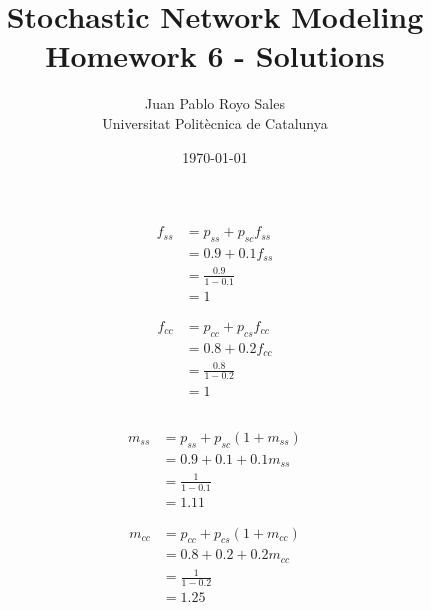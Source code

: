 \documentclass[12pt, a4paper]{article}
\title{%
  Stochastic Network Modeling \\
  Homework 6 - Solutions
}
\author{%
  Juan Pablo Royo Sales\\
  \small{Universitat Politècnica de Catalunya}
}
\date\today
\begin{document}
\maketitle

\section{}
\subsection{}
\begin{subequations}
  \begin{align}
    f_{ss} &= p_{ss} + p_{sc}f_{ss}\\
           &= 0.9 + 0.1 f_{ss}\\
           &= \frac{0.9}{1-0.1}\\
           &= 1
  \end{align}
\end{subequations}


\begin{subequations}
  \begin{align}
    f_{cc} &= p_{cc} + p_{cs}f_{cc}\\
           &= 0.8 + 0.2 f_{cc}\\
           &= \frac{0.8}{1-0.2}\\
           &= 1
  \end{align}
\end{subequations}


\subsection{}

\begin{subequations}
  \begin{align}
    m_{ss} &= p_{ss} + p_{sc}(1 + m_{ss})\\
           &= 0.9 + 0.1  + 0.1 m_{ss}\\
           &= \frac{1}{1-0.1}\\
           &= 1.11
  \end{align}
\end{subequations}


\begin{subequations}
  \begin{align}
    m_{cc} &= p_{cc} + p_{cs}(1 + m_{cc})\\
           &= 0.8 + 0.2  + 0.2 m_{cc}\\
           &= \frac{1}{1-0.2}\\
           &= 1.25
  \end{align}
\end{subequations}
\end{document}
